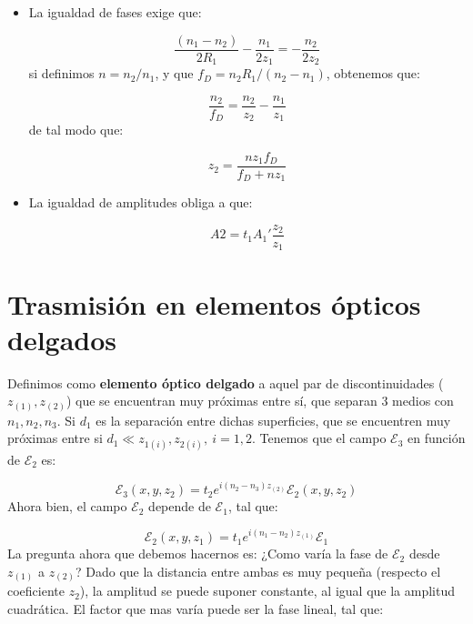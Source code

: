 \documentclass[12pt,a4paper]{book}
\numberwithin{equation}{section}
\numberwithin{figure}{section}
\newcommand{\1}{_{(1)}}
\newcommand{\2}{_{(2)}}
\theoremstyle{definition}
\begin{document}
\begin{itemize}
\item La igualdad de fases exige que: 

\begin{equation}
\frac{(n_1-n_2)}{2 R_1} - \frac{n_1}{ 2 z_1} = - \frac{n_2}{2 z_2}
\end{equation}
si definimos $n=n_2/n_1$, y que $f_D = n_2 R_1 /(n_2-n_1)$, obtenemos que:

\begin{equation}
\frac{n_2}{f_D} = \frac{n_2}{z_2} - \frac{n_1}{z_1}
\end{equation}
de tal modo que:

\begin{equation}
z_2=\frac{n z_1 f_D}{f_D+nz_1}
\end{equation}

\item La igualdad de amplitudes obliga a que:

\begin{equation}
A2 = t_1 A_1' \frac{z_2}{z_1}
\end{equation}

\end{itemize}

\hrulefill

\section{Trasmisión en elementos ópticos delgados}

Definimos como \textbf{elemento óptico delgado} a aquel par de discontinuidades ($z_{(1)},z_{(2)}$) que se encuentran muy próximas entre sí, que separan 3 medios con $n_1,n_2,n_3$. Si $d_1$ es la separación entre dichas superficies, que se encuentren muy próximas entre si  $d_1 \ll z_{1(i)},z_{2(i)}, \ i=1,2$. Tenemos que el campo $\mathcal{E}_3$ en función de $\mathcal{E}_2$ es:

\begin{equation}
\mathcal{E}_3 (x,y,z_2) = t_2 e^{i (n_2-n_3)z_{(2)}} \mathcal{E}_2 (x,y,z_2)
\end{equation}
Ahora bien, el campo $\mathcal{E}_2$ depende de $\mathcal{E}_1$, tal que:

\begin{equation}
\mathcal{E}_2 (x,y,z_1) = t_1 e^{i (n_1-n_2)z_{(1)}} \mathcal{E}_1
\end{equation}
La pregunta ahora que debemos hacernos es: ¿Como varía la fase de $\mathcal{E_2}$ desde $z_{(1)}$ a $z_{(2)}$? Dado que la distancia entre ambas es muy pequeña (respecto el coeficiente $z_2$), la amplitud se puede suponer constante, al igual que la amplitud cuadrática. El factor que mas varía puede ser la fase lineal, tal que:
\end{document}
